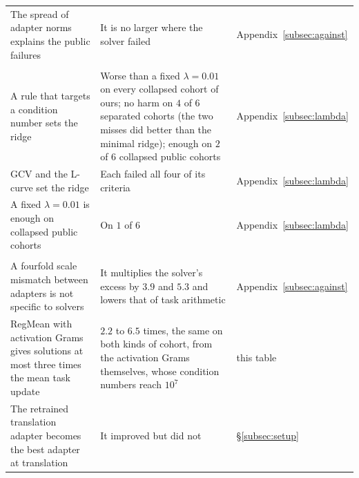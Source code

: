 \begin{table}[pos=htbp]
\begin{tabularx}{\textwidth}{>{\raggedright\arraybackslash}X
                >{\raggedright\arraybackslash}X
                >{\raggedright\arraybackslash}p{1.9cm}}
The spread of adapter norms explains the public failures & It is no larger where the solver failed & Appendix~\ref{subsec:against} \\
\addlinespace
\multicolumn{3}{l}{\emph{Setting the ridge without data}} \\
A rule that targets a condition number sets the ridge & Worse than a fixed $\lambda = 0.01$ on every collapsed cohort of ours; no harm on $4$ of $6$ separated cohorts (the two misses did better than the minimal ridge); enough on $2$ of $6$ collapsed public cohorts & Appendix~\ref{subsec:lambda} \\
GCV and the L-curve set the ridge & Each failed all four of its criteria & Appendix~\ref{subsec:lambda} \\
A fixed $\lambda = 0.01$ is enough on collapsed public cohorts & On $1$ of $6$ & Appendix~\ref{subsec:lambda} \\
\addlinespace
\multicolumn{3}{l}{\emph{Details}} \\
A fourfold scale mismatch between adapters is not specific to solvers & It multiplies the solver's excess by $3.9$ and $5.3$ and lowers that of task arithmetic & Appendix~\ref{subsec:against} \\
RegMean with activation Grams gives solutions at most three times the mean task update & $2.2$ to $6.5$ times, the same on both kinds of cohort, from the activation Grams themselves, whose condition numbers reach $10^{7}$ & this table \\
The retrained translation adapter becomes the best adapter at translation & It improved but did not & \S\ref{subsec:setup} \\
\bottomrule
\end{tabularx}
\end{table}
